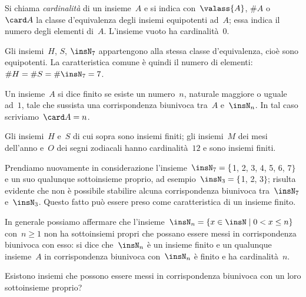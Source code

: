 \begin{definizione}
Si chiama \emph{cardinalità} di un insieme~$A$ e si indica con~$\valass{A}$, $\#A$ o~$\card A$ la classe d'equivalenza degli
insiemi equipotenti ad~$A$; essa indica il numero degli elementi di~$A$. L'insieme vuoto ha cardinalità~$0$.
\end{definizione}

Gli insiemi~$H$, $S$, $\insN_7$ appartengono alla stessa classe d'equivalenza, cioè sono equipotenti. La caratteristica comune è quindi il numero di elementi:~$\#H = \#S = \#\insN_7 = 7$.

\begin{definizione}
Un insieme~$A$ si dice finito se esiste un numero~$n$, naturale maggiore o uguale ad~$1$, tale che sussista una corrispondenza
biunivoca tra~$A$ e~$\insN_{n}$. In tal caso scriviamo~$\card A=n$.
\end{definizione}

Gli insiemi~$H$ e~$S$ di cui sopra sono insiemi finiti; gli insiemi~$M$ dei mesi dell'anno e~$O$ dei segni zodiacali
hanno cardinalità~$12$ e sono insiemi finiti.

Prendiamo nuovamente in considerazione l'insieme~$\insN_{7}=\{$1, 2, 3, 4, 5, 6, 7$\}$ e un suo qualunque sottoinsieme proprio,
ad esempio~$\insN_{3}=\{$1, 2, 3$\}$; risulta evidente che non è possibile stabilire alcuna corrispondenza biunivoca tra~$\insN_{7}$ e~$\insN_{3}$.
Questo fatto può essere preso come caratteristica di un insieme finito.

In generale possiamo affermare che l'insieme~$\insN_{n}=\{x\in \insN\mid  0<x\le n\}$ con~$n\ge 1$ non ha
sottoinsiemi propri che possano essere messi in corrispondenza biunivoca con esso: si dice che~$\insN_{n}$ è un insieme
finito e un qualunque insieme~$A$ in corrispondenza biunivoca con~$\insN_{n}$ è finito e ha cardinalità~$n$.

Esistono insiemi che possono essere messi in corrispondenza biunivoca con un loro sottoinsieme proprio?

